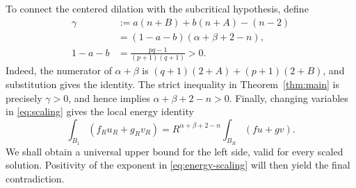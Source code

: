 To connect the centered dilation with the subcritical hypothesis, define
\begin{equation}\label{eq:gap}
 \begin{split}
 \gamma
 &:=a(n+B)+b(n+A)-(n-2)\\
 &=(1-a-b)(\alpha+\beta+2-n),\\
 1-a-b&=\frac{pq-1}{(p+1)(q+1)}>0.
 \end{split}
\end{equation}
Indeed, the numerator of $\alpha+\beta$ is
$(q+1)(2+A)+(p+1)(2+B)$, and substitution gives the identity.
The strict inequality in Theorem~\ref{thm:main} is precisely
$\gamma>0$, and hence implies $\alpha+\beta+2-n>0$.
Finally, changing variables in \eqref{eq:scaling} gives the local
energy identity
\begin{equation}\label{eq:energy-scaling}
 \int_{B_1}(f_Ru_R+g_Rv_R)
 =R^{\alpha+\beta+2-n}\int_{B_R}(fu+gv).
\end{equation}
We shall obtain a universal upper bound for the left side, valid for
every scaled solution.  Positivity of the exponent in
\eqref{eq:energy-scaling} will then yield the final contradiction.
